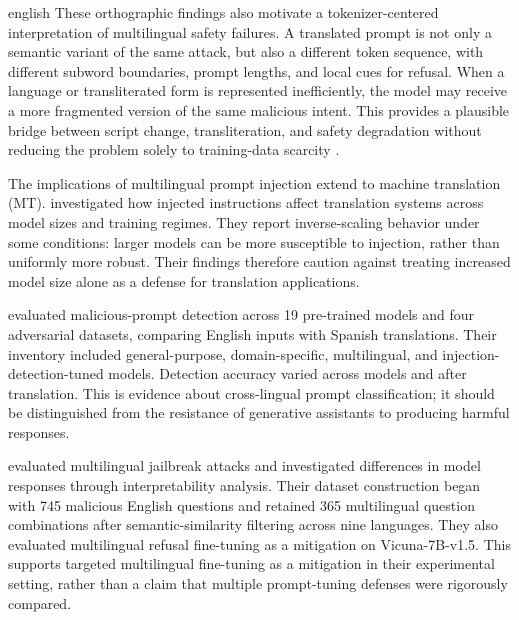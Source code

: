\begin{otherlanguage*}{english}
These orthographic findings also motivate a tokenizer-centered interpretation of multilingual safety failures. A translated prompt is not only a semantic variant of the same attack, but also a different token sequence, with different subword boundaries, prompt lengths, and local cues for refusal. When a language or transliterated form is represented inefficiently, the model may receive a more fragmented version of the same malicious intent. This provides a plausible bridge between script change, transliteration, and safety degradation without reducing the problem solely to training-data scarcity \cite{ghanimJailbreakingLLMsArabic2024,rust2021tokenizer}.

The implications of multilingual prompt injection extend to machine translation (MT). \textcite{sunScalingBehaviorMachine2024a} investigated how injected instructions affect translation systems across model sizes and training regimes. They report inverse-scaling behavior under some conditions: larger models can be more susceptible to injection, rather than uniformly more robust. Their findings therefore caution against treating increased model size alone as a defense for translation applications.

\textcite{abbasiMultilingualPromptInjection2025} evaluated malicious-prompt detection across 19 pre-trained models and four adversarial datasets, comparing English inputs with Spanish translations. Their inventory included general-purpose, domain-specific, multilingual, and injection-detection-tuned models. Detection accuracy varied across models and after translation. This is evidence about cross-lingual prompt classification; it should be distinguished from the resistance of generative assistants to producing harmful responses.

\textcite{liCrossLanguageInvestigationJailbreak2024} evaluated multilingual jailbreak attacks and investigated differences in model responses through interpretability analysis. Their dataset construction began with 745 malicious English questions and retained 365 multilingual question combinations after semantic-similarity filtering across nine languages. They also evaluated multilingual refusal fine-tuning as a mitigation on Vicuna-7B-v1.5. This supports targeted multilingual fine-tuning as a mitigation in their experimental setting, rather than a claim that multiple prompt-tuning defenses were rigorously compared.


\end{otherlanguage*}
